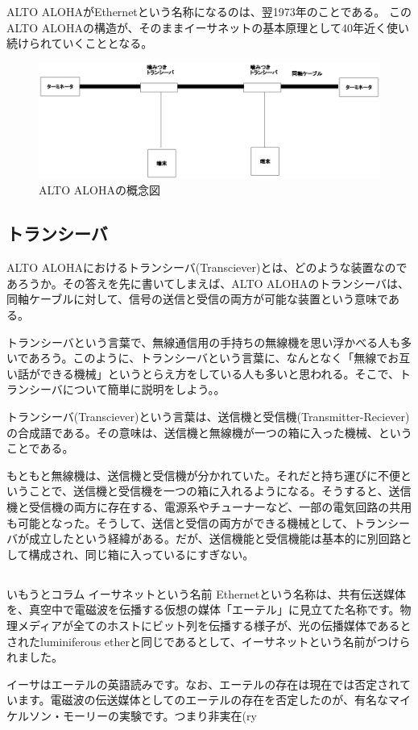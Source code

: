 ALTO ALOHAがEthernetという名称になるのは、翌1973年のことである。
このALTO ALOHAの構造が、そのままイーサネットの基本原理として40年近く使い続けられていくこととなる。

\begin{figure}[htbp]
	\includegraphics[width=12cm,clip]{draw/altoaloha.eps}
	\caption{ALTO ALOHAの概念図}
	\label{fig:altoaloha}
\end{figure}

\subsection{トランシーバ}

ALTO ALOHAにおけるトランシーバ(Transciever)とは、どのような装置なのであろうか。その答えを先に書いてしまえば、ALTO ALOHAのトランシーバは、同軸ケーブルに対して、信号の送信と受信の両方が可能な装置という意味である。

トランシーバという言葉で、無線通信用の手持ちの無線機を思い浮かべる人も多いであろう。このように、トランシーバという言葉に、なんとなく「無線でお互い話ができる機械」というとらえ方をしている人も多いと思われる。そこで、トランシーバについて簡単に説明をしよう。。

トランシーバ(Transciever)という言葉は、送信機と受信機(Transmitter-Reciever)の合成語である。その意味は、送信機と無線機が一つの箱に入った機械、ということである。

もともと無線機は、送信機と受信機が分かれていた。それだと持ち運びに不便ということで、送信機と受信機を一つの箱に入れるようになる。そうすると、送信機と受信機の両方に存在する、電源系やチューナーなど、一部の電気回路の共用も可能となった。そうして、送信と受信の両方ができる機械として、トランシーバが成立したという経緯がある。だが、送信機能と受信機能は基本的に別回路として構成され、同じ箱に入っているにすぎない。

\subsection*{}
\begin{itembox}[l]{いもうとコラム イーサネットという名前}
Ethernetという名称は、共有伝送媒体を、真空中で電磁波を伝播する仮想の媒体「エーテル」に見立てた名称です。物理メディアが全てのホストにビット列を伝播する様子が、光の伝播媒体であるとされたluminiferous etherと同じであるとして、イーサネットという名前がつけられました。

イーサはエーテルの英語読みです。なお、エーテルの存在は現在では否定されています。電磁波の伝送媒体としてのエーテルの存在を否定したのが、有名なマイケルソン・モーリーの実験です。つまり非実在(ry
\end{itembox}

